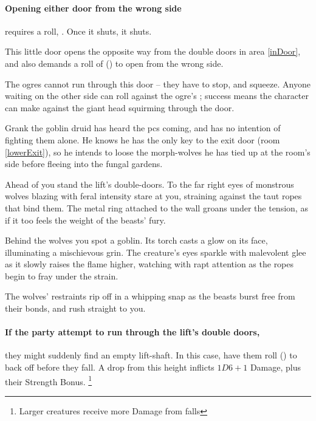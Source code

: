 \begin{multicols}{2}
\paragraph{Opening either door from the wrong side}
requires a  roll, \tn[10].
Once it shuts, it shuts.


This little door opens the opposite way from the double doors in area \ref{inDoor}, and also demands a roll of  (\tn[10]) to open from the wrong side.

The \glspl{ogre} cannot run through this door -- they have to stop, and squeeze.
Anyone waiting on the other side can roll  against the ogre's ; success means the character can make  against the giant head squirming through the door.%



Grank the goblin druid has heard the \glspl{pc} coming, and has no intention of fighting them alone.
He knows he has the only key to the exit door (room \vref{lowerExit}), so he intends to loose the morph-wolves he has tied up at the room's side before fleeing into the fungal gardens.

\begin{boxtext}
  Ahead of you stand the lift's double-doors.
  To the far right eyes of monstrous wolves blazing with feral intensity stare at you, straining against the taut ropes that bind them.
  The metal ring attached to the wall groans under the tension, as if it too feels the weight of the beasts' fury.

  Behind the wolves you spot a goblin.
  Its torch casts a glow on its face, illuminating a mischievous grin.
  The creature's eyes sparkle with malevolent glee as it slowly raises the flame higher, watching with rapt attention as the ropes begin to fray under the strain.

  The wolves' restraints rip off in a whipping snap as the beasts burst free from their bonds, and rush straight to you.
\end{boxtext}

\paragraph{If the party attempt to run through the lift's double doors,}
they might suddenly find an empty lift-shaft.
In this case, have them roll  (\tn[7]) to back off before they fall.
A drop from this height inflicts $1D6+1$ Damage, plus their Strength Bonus.%
\footnote{Larger creatures receive more Damage from falls}


\end{multicols}

